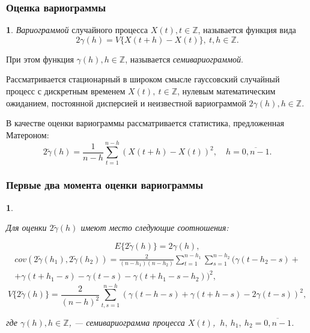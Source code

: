 \documentclass[notheorems]{beamer}
\newtheorem{theorem}{\translate{Theorem}}[section]
\newtheorem{theorem}{\translate{Theorem}}
\theoremstyle{definition}
\newtheorem{definition}{\translate{Definition}}
\theoremstyle{example}
\theoremstyle{plain}
\newenvironment{Theorem}{\begin{theorem}}{\end{theorem}}
\newenvironment{Definition}{\begin{definition}}{\end{definition}}
\begin{document}
\begin{frame}
\begin{footnotesize}
  \frametitle{Оценка вариограммы}
  \begin{Definition}
    \textit{Вариограммой} случайного процесса $ X(t), t \in \mathbb{Z} $, называется функция вида
    \begin{equation}
    \label{eq:matheron}
        2 \gamma (h) = V \{ X(t + h) - X(t) \},~ t, h \in \mathbb{Z}.
    \end{equation}

    При этом функция $ \gamma (h), h \in \mathbb{Z} $, называется \textit{семивариограммой}.
  \end{Definition}
  
  \vspace{0.5em}
  
  Рассматривается стационарный в широком смысле гауссовский случайный процесс с дискретным временем $ X(t),~ t \in \mathbb{Z} $, нулевым математическим ожиданием, постоянной дисперсией и неизвестной вариограммой $ 2 \gamma(h), h \in \mathbb{Z} $.
\end{footnotesize}
  
  \vspace{0.5em}
  
  В качестве оценки вариограммы рассматривается статистика, предложенная Матероном:
  \begin{equation}
    2 \tilde{\gamma}(h) = \frac{1}{n - h} \sum_{t = 1}^{n - h}(X(t + h) - X(t))^2, \quad h = \overline{0, n - 1}.
  \end{equation}
\end{frame}

\begin{frame}
  \frametitle{Первые два момента оценки вариограммы}
\begin{Theorem}
\begin{footnotesize}
  Для оценки $ 2 \tilde{\gamma}(h) $ имеют место следующие соотношения:
\end{footnotesize}
  \begin{equation*}
    E \{2 \tilde{\gamma}(h) \} = 2 \gamma(h), %
  \end{equation*}
  \begin{eqnarray*}
    cov(2 \tilde{\gamma}(h_1), 2 \tilde{\gamma}(h_2)) = \frac{2}{(n - h_1)(n - h_2)} \sum_{t = 1}^{n - h_1}\sum_{s = 1}^{n - h_2} (\gamma(t - h_2 - s) + \\
    + \gamma(t + h_1 - s) - \gamma(t - s) - \gamma(t + h_1 - s - h_2))^2,
  \end{eqnarray*}
  \begin{equation*}
    V \{ 2 \tilde{\gamma}(h) \} = \frac{2}{(n-h)^2}\sum_{t,s = 1}^{n - h} ( \gamma(t - h - s) + \gamma(t + h - s) - 2\gamma(t - s) )^2,
  \end{equation*}
\begin{footnotesize}
  где $ \gamma(h), h \in \mathbb{Z} $, --- семивариограмма процесса $ X(t) $, $ ~h,~ h_1,~ h_2 = \overline{0, n - 1} $.
\end{footnotesize}
\end{Theorem}
\end{frame}
\end{document}
